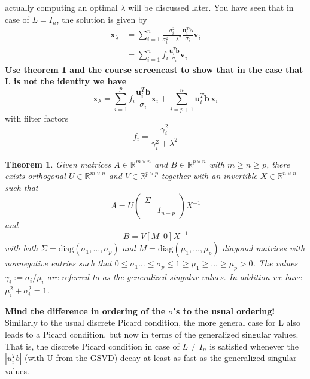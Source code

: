 \documentclass[12pt]{article}
\newtheorem{theorem}{Theorem}
\newcommand{\mbf}[1]{\mathbf{#1}}
\begin{document}
actually computing an optimal $\lambda$ will be discussed later. You have seen that in case of $L = I_n$, the solution is given by
\begin{align*}
\mbf{x}_{\lambda}&=\sum_{i=1}^n\frac{\sigma_i^2}{\sigma_i^2+\lambda^2}\frac{\mbf{u}_i^T\mbf{b}}{\sigma_i}\mathbf{v}_i\\
&=\sum_{i=1}^nf_i\frac{\mbf{u}_i^T\mbf{b}}{\sigma_i}\mathbf{v}_i
\end{align*}
\textbf{Use theorem \ref{thm:GSVD} and the course screencast to show that in the case that L is not the
identity we have}
\begin{equation*}
\mbf{x}_{\lambda}=\sum_{i=1}^pf_i\frac{\mbf{u}_i^T\mbf{b}}{\sigma_i}\mathbf{x}_i+
\sum_{i=p+1}^n\mbf{u}_i^T\mbf{b}\,\mathbf{x}_i
\end{equation*}
with filter factors
$$f_i=\frac{\gamma_i^2}{\gamma_i^2+\lambda^2}$$
\begin{theorem}\label{thm:GSVD}
Given matrices $A \in \mathbb{R}^{m\times n}$ and $B\in\mathbb{R}^{p\times n}$ with $m \geq n \geq p$,
there exists orthogonal $U \in \mathbb{R}^{m\times n}$ and $V \in \mathbb{R}^{p\times p}$ together with an invertible $X \in \mathbb{R}^{n\times n}$ such that
$$A=U\begin{pmatrix}
\Sigma&\\
&I_{n-p}
\end{pmatrix}X^{-1}$$
and
$$B=V[M \enspace 0]X^{-1}$$
with both $\Sigma=\text{diag}(\sigma_1,\ldots,\sigma_p)$ and $M=\text{diag}(\mu_1,\ldots,\mu_p)$ diagonal matrices with nonnegative entries such that $0\leq\sigma_1\ldots\leq\sigma_p\leq 1\geq\mu_1\geq\ldots\geq\mu_p> 0$. The values $\gamma_i:=\sigma_i/\mu_i$ are referred to as the generalized singular values. In addition we have $\mu_i^2+\sigma_i^2=1$.
\end{theorem}
\textbf{Mind the difference in ordering of the $\sigma$'s to the usual ordering!}
Similarly to the usual discrete Picard condition, the more general case for L also leads to a Picard
condition, but now in terms of the generalized singular values. That is, the discrete Picard condition
in case of $L \neq I_n$ is satisfied whenever the $|u^T_i b|$ (with U from the GSVD) decay at least as fast as
the generalized singular values.
\end{document}
